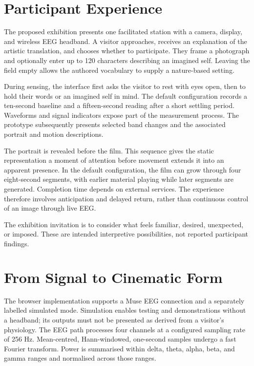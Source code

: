 \documentclass[manuscript,screen,nonacm]{acmart}
\begin{document}
\section{Participant Experience}
The proposed exhibition presents one facilitated station with a camera, display, and wireless EEG headband. A visitor approaches, receives an explanation of the artistic translation, and chooses whether to participate. They frame a photograph and optionally enter up to 120 characters describing an imagined self. Leaving the field empty allows the authored vocabulary to supply a nature-based setting.

During sensing, the interface first asks the visitor to rest with eyes open, then to hold their words or an imagined self in mind. The default configuration records a ten-second baseline and a fifteen-second reading after a short settling period. Waveforms and signal indicators expose part of the measurement process. The prototype subsequently presents selected band changes and the associated portrait and motion descriptions.

The portrait is revealed before the film. This sequence gives the static representation a moment of attention before movement extends it into an apparent presence. In the default configuration, the film can grow through four eight-second segments, with earlier material playing while later segments are generated. Completion time depends on external services. The experience therefore involves anticipation and delayed return, rather than continuous control of an image through live EEG.

The exhibition invitation is to consider what feels familiar, desired, unexpected, or imposed. These are intended interpretive possibilities, not reported participant findings.

\section{From Signal to Cinematic Form}
The browser implementation supports a Muse EEG connection and a separately labelled simulated mode. Simulation enables testing and demonstrations without a headband; its outputs must not be presented as derived from a visitor's physiology. The EEG path processes four channels at a configured sampling rate of 256 Hz. Mean-centred, Hann-windowed, one-second samples undergo a fast Fourier transform. Power is summarised within delta, theta, alpha, beta, and gamma ranges and normalised across those ranges.
\end{document}
